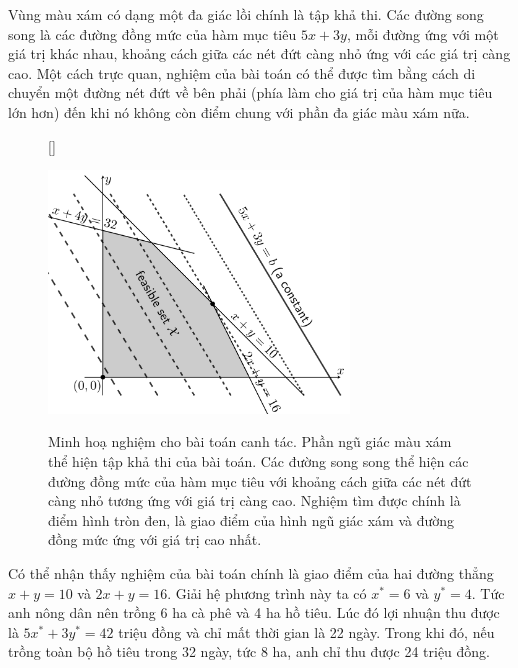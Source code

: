 Vùng màu xám có dạng một đa giác lồi chính
là tập khả thi. Các đường song song là các
đường {đồng mức} của hàm mục tiêu $5x + 3y$, mỗi
đường ứng với một giá trị khác nhau, khoảng cách giữa các nét đứt càng nhỏ
ứng với các giá trị càng cao. Một cách trực quan, nghiệm của bài toán có thể được tìm bằng cách di chuyển một đường nét đứt về bên phải (phía làm cho
giá trị của hàm mục tiêu lớn hơn) đến khi nó không còn điểm chung với phần đa
giác màu xám nữa.
\begin{figure}[t]
[\FBwidth]
{\caption{Minh hoạ nghiệm cho bài toán canh tác. Phần ngũ giác màu xám thể
hiện tập khả thi của bài toán. Các đường song song thể hiện
các đường đồng mức của hàm mục tiêu với khoảng cách giữa các nét đứt càng
nhỏ tương ứng với giá trị càng cao. Nghiệm tìm được chính là điểm hình tròn
đen, là giao điểm của hình ngũ giác xám và đường đồng mức ứng với giá trị
cao nhất.}
\label{fig:16_lp1}}
{\includegraphics[width=8cm]{Chapters/08_ConvexOptimization/17_convexopt/latex/planting.pdf}}
\end{figure}

Có thể nhận thấy nghiệm của bài toán chính là giao điểm của hai đường thẳng $x +
y = 10$ và $2x + y = 16$. Giải hệ phương trình này ta có $x^* = 6$ và $y^* = 4$.
Tức anh nông dân nên trồng 6 ha cà phê và 4 ha hồ tiêu. Lúc đó lợi nhuận thu được
là $5x^* + 3y^* = 42 $ triệu đồng và chỉ mất thời gian là 22 ngày.
Trong khi đó, nếu trồng toàn bộ hồ tiêu trong 32 ngày, tức 8 ha, anh chỉ thu được
24 triệu đồng.

